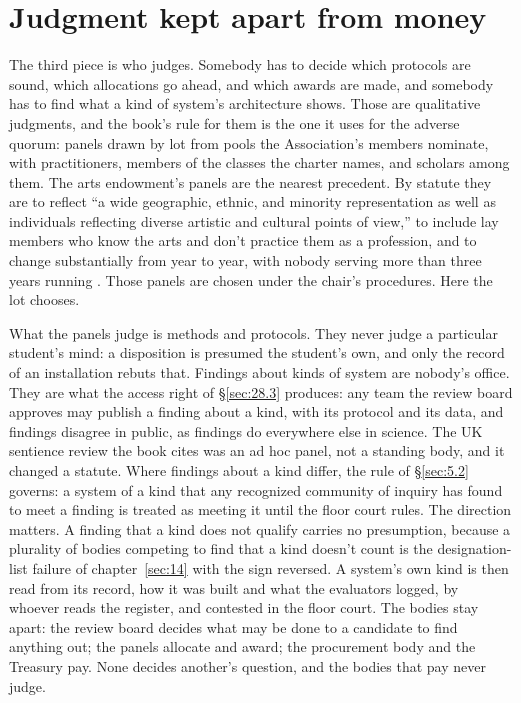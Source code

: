 \section{Judgment kept apart from money}
\label{sec:28.6}
The third piece is who judges. Somebody has to decide which protocols are sound, which allocations go ahead, and which awards are made, and somebody has to find what a kind of system's architecture shows. Those are qualitative judgments, and the book's rule for them is the one it uses for the adverse quorum: panels drawn by lot from pools the Association's members nominate, with practitioners, members of the classes the charter names, and scholars among them. The arts endowment's panels are the nearest precedent. By statute they are to reflect “a wide geographic, ethnic, and minority representation as well as individuals reflecting diverse artistic and cultural points of view,” to include lay members who know the arts and don't practice them as a profession, and to change substantially from year to year, with nobody serving more than three years running \autocite{us1965artsact}. Those panels are chosen under the chair's procedures. Here the lot chooses.

What the panels judge is methods and protocols. They never judge a particular student's mind: a disposition is presumed the student's own, and only the record of an installation rebuts that. Findings about kinds of system are nobody's office. They are what the access right of \S\ref{sec:28.3} produces: any team the review board approves may publish a finding about a kind, with its protocol and its data, and findings disagree in public, as findings do everywhere else in science. The UK sentience review the book cites was an ad hoc panel, not a standing body, and it changed a statute. Where findings about a kind differ, the rule of \S\ref{sec:5.2} governs: a system of a kind that any recognized community of inquiry has found to meet a finding is treated as meeting it until the floor court rules. The direction matters. A finding that a kind does not qualify carries no presumption, because a plurality of bodies competing to find that a kind doesn't count is the designation-list failure of chapter~\ref{sec:14} with the sign reversed. A system's own kind is then read from its record, how it was built and what the evaluators logged, by whoever reads the register, and contested in the floor court. The bodies stay apart: the review board decides what may be done to a candidate to find anything out; the panels allocate and award; the procurement body and the Treasury pay. None decides another's question, and the bodies that pay never judge.

